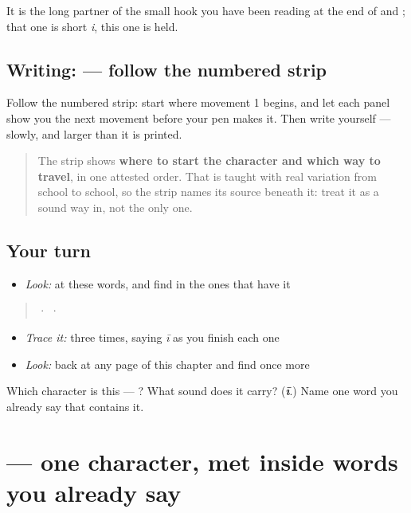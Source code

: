 It is the long partner of the small hook you have been reading at the end of \textbf{} and \textbf{}; that one is short \emph{i}, this one is held.

\subsection*{Writing:  — follow the numbered strip}

Follow the numbered strip: start where movement 1 begins, and let each panel show you the next movement before your pen makes it. Then write  yourself — slowly, and larger than it is printed.

\begin{quote}
The strip shows \textbf{where to start the character and which way to travel}, in one attested order. That is taught with real variation from school to school, so the strip names its source beneath it: treat it as a sound way in, not the only one.
\end{quote}

\subsection*{Your turn}
\begin{itemize}
\raggedright
  \item \emph{Look:} at these words, and find  in the ones that have it
\end{itemize}

\begin{quote}
  ·    ·  
\end{quote}

\begin{itemize}
\raggedright
  \item \emph{Trace it:}  three times, saying \emph{ī} as you finish each one
  \item \emph{Look:} back at any page of this chapter and find  once more
\end{itemize}

\begin{tcolorbox}[breakable,colback=teal!4,colframe=teal!35!black,title={Before you move on}]
Which character is this — ? What sound does it carry? (\emph{\textbf{ī}}.) Name one word you already say that contains it.
\end{tcolorbox}
\section[\texorpdfstring{\ml{ൾ} (ḷ)}{ൾ (ḷ)}]{ — one character, met inside words you already say}

